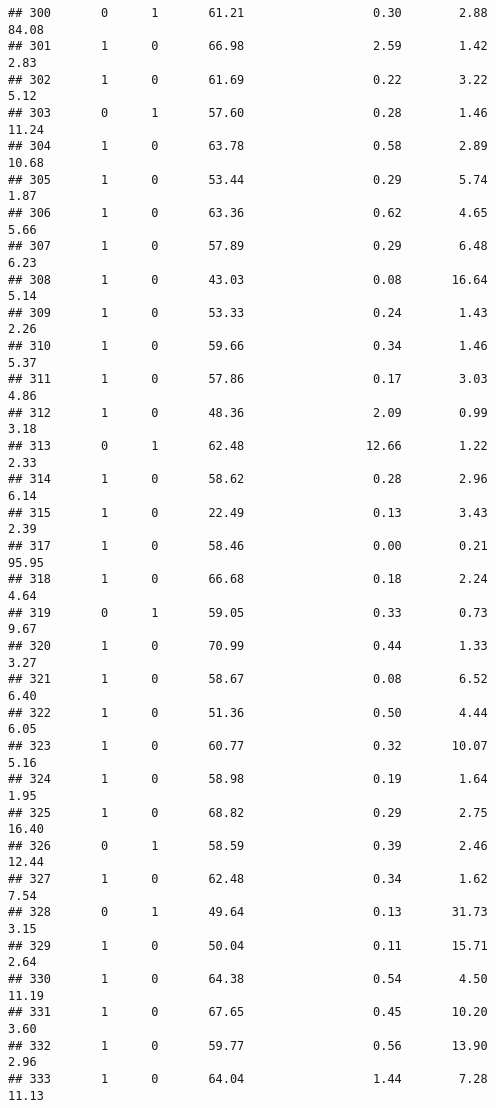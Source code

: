 \documentclass[
]{article}
\begin{document}
\begin{verbatim}
## 300       0      1       61.21                  0.30        2.88       84.08
## 301       1      0       66.98                  2.59        1.42        2.83
## 302       1      0       61.69                  0.22        3.22        5.12
## 303       0      1       57.60                  0.28        1.46       11.24
## 304       1      0       63.78                  0.58        2.89       10.68
## 305       1      0       53.44                  0.29        5.74        1.87
## 306       1      0       63.36                  0.62        4.65        5.66
## 307       1      0       57.89                  0.29        6.48        6.23
## 308       1      0       43.03                  0.08       16.64        5.14
## 309       1      0       53.33                  0.24        1.43        2.26
## 310       1      0       59.66                  0.34        1.46        5.37
## 311       1      0       57.86                  0.17        3.03        4.86
## 312       1      0       48.36                  2.09        0.99        3.18
## 313       0      1       62.48                 12.66        1.22        2.33
## 314       1      0       58.62                  0.28        2.96        6.14
## 315       1      0       22.49                  0.13        3.43        2.39
## 317       1      0       58.46                  0.00        0.21       95.95
## 318       1      0       66.68                  0.18        2.24        4.64
## 319       0      1       59.05                  0.33        0.73        9.67
## 320       1      0       70.99                  0.44        1.33        3.27
## 321       1      0       58.67                  0.08        6.52        6.40
## 322       1      0       51.36                  0.50        4.44        6.05
## 323       1      0       60.77                  0.32       10.07        5.16
## 324       1      0       58.98                  0.19        1.64        1.95
## 325       1      0       68.82                  0.29        2.75       16.40
## 326       0      1       58.59                  0.39        2.46       12.44
## 327       1      0       62.48                  0.34        1.62        7.54
## 328       0      1       49.64                  0.13       31.73        3.15
## 329       1      0       50.04                  0.11       15.71        2.64
## 330       1      0       64.38                  0.54        4.50       11.19
## 331       1      0       67.65                  0.45       10.20        3.60
## 332       1      0       59.77                  0.56       13.90        2.96
## 333       1      0       64.04                  1.44        7.28       11.13

\end{verbatim}
\end{document}
